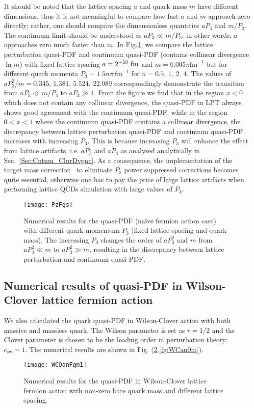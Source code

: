 \documentclass[english,preprint,aps,prd,showpacs,superscriptaddress,nofootinbib,tightenlines]{revtex4}
\begin{document}
It should be noted that the lattice spacing $a$ and quark mass $m$
have different dimensions,  thus it is not meaningful to compare how fast
$a$ and $m$ approach zero directly; rather, one should compare the dimensionless
quantities $aP_{3}$ and $m/P_{3}$. The continuum limit should be understood
as $aP_{3}\ll m/P_{3}$, in other words, $a$ approaches  zero much
faster than $m$. In Fig.\ref{fg:nPz_3D}, we compare the lattice
perturbation quasi-PDF and continuum quasi-PDF (contains collinear divergence $\ln m$) with fixed lattice
spacing $a=2^{-10}~{\rm fm}$ and $m=0.005\pi\text{fm}^{-1}$ but for different quark
momenta $P_{3}=1.5n\pi\,\text{fm}^{-1}$ for $n=0.5,\,1,\,2,\,4$.  The values of
$aP_{3}^{2}/m=0.345,\,1.381,\,5.524,\,22.089$ correspondingly demonstrate the transition
from $aP_{3}\ll m/P_{3}$ to $aP_{3}\gg1$. From the figure we
find that in the region $x<0$ which does not contain any collinear divergence,
the quasi-PDF in LPT always shows good agreement with
the continuum quasi-PDF, while in the region $0<x<1$ where the continuum
quasi-PDF contains a collinear divergence, the discrepancy between lattice
perturbation quasi-PDF and continuum quasi-PDF increases with increasing
$P_{3}$. This is because increasing $P_{3}$ will enhance the effect
from lattice artifacts, i.e. $aP_{3}$ and $aP_{4}$ as analysed analytically in Sec.~\ref{Sec:Cntnm_ClnrDvgnc}. As a consequence,
the implementation of  the target mass correction~\cite{Chen:2016utp} to eliminate
$P_{3}$ power suppressed corrections becomes quite essential, otherwise
one has to pay the price of large lattice artifacts when performing lattice QCDs simulation with large values of $P_{3}$.

\begin{figure}
\centering{}\texttt{[image: PzFgs]}\caption{Numerical results for the quasi-PDF (na\"ive fermion action case) with different quark momentum $P_{3}$
(fixed lattice spacing and quark mass). The increasing $P_{3}$ changes
the order of $aP_{3}^{2}$ and $m$ from $aP_{3}^{2}\ll m$ to $aP_{3}^{2}\gg m$,
resulting in the discrepancy between lattice perturbation and continuum
quasi-PDF.}
\label{fg:nPz_3D}
\end{figure}


\subsection{Numerical results of quasi-PDF in Wilson-Clover lattice fermion action}
We also calculated the quark quasi-PDF in Wilson-Clover action with both massive and massless quark. The Wilson parameter is set as $r=1/2$ and the Clover parameter is chosen to be the leading order in perturbation theory: $c_\mathrm{sw}=1$. The numerical results are shown in Fig. (\ref{fg:WCanm1},\ref{fg:WCan0m}).
\begin{figure}
  \centering{}\texttt{[image: WCOanFgm1]}\caption{Numerical results for the  quasi-PDF in Wilson-Clover lattice fermion action with non-zero bare quark mass and different lattice spacing.}
  \label{fg:WCanm1}
  \end{figure}
\end{document}
